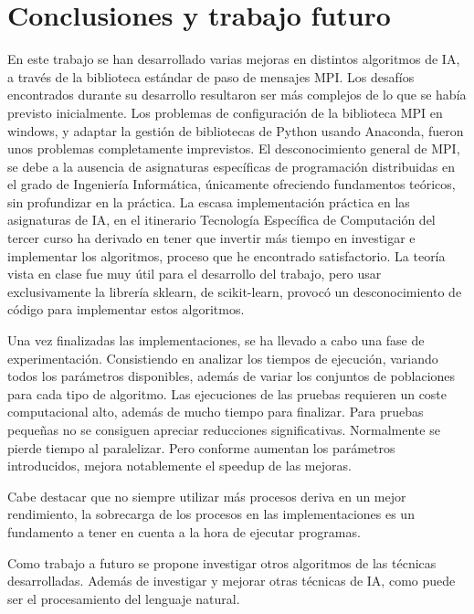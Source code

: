 \chapter{Conclusiones y trabajo futuro}
\label{cap:c5_conclu}

	En este trabajo se han desarrollado varias mejoras en distintos algoritmos de IA, a través de la biblioteca estándar de paso de mensajes MPI.
	Los desafíos encontrados durante su desarrollo resultaron ser más complejos de lo que se había previsto inicialmente. Los problemas de configuración de la biblioteca MPI en windows, y adaptar la gestión de bibliotecas de Python usando Anaconda, fueron unos problemas completamente imprevistos. El desconocimiento general de  MPI, se debe a la ausencia de asignaturas específicas de programación distribuidas en el grado de Ingeniería Informática, únicamente ofreciendo fundamentos teóricos, sin profundizar en la práctica. 
	La escasa implementación práctica en las asignaturas de IA, en el itinerario Tecnología Específica de Computación del tercer curso ha derivado en tener que invertir más tiempo en investigar e implementar los algoritmos, proceso que he encontrado satisfactorio. La teoría vista en clase fue muy útil para el desarrollo del trabajo, pero usar exclusivamente la librería sklearn, de scikit-learn, provocó un desconocimiento de código para implementar estos algoritmos.
	
	Una vez finalizadas las implementaciones, se ha llevado a cabo una fase de experimentación. Consistiendo en analizar los tiempos de ejecución, variando todos los parámetros disponibles, además de variar los conjuntos de poblaciones para cada tipo de algoritmo.
	Las ejecuciones de las pruebas requieren un coste computacional alto, además de mucho tiempo para finalizar. Para pruebas pequeñas no se consiguen apreciar reducciones significativas. Normalmente se pierde tiempo al paralelizar. Pero conforme aumentan los parámetros introducidos, mejora notablemente el speedup de las mejoras.
	
	Cabe destacar que no siempre utilizar más procesos deriva en un mejor rendimiento, la sobrecarga de los procesos en las implementaciones es un fundamento a tener en cuenta a la hora de ejecutar programas.	
	
	
	Como trabajo a futuro se propone investigar otros algoritmos de las técnicas desarrolladas. Además de investigar y mejorar otras técnicas de IA, como puede ser el procesamiento del lenguaje natural.
	
	
	
	
	